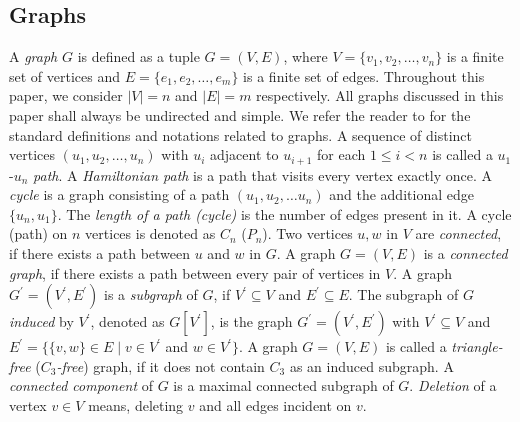 \documentclass[review, 1p]{elsarticle}
\begin{document}
\subsection{\textbf{Graphs}} \noindent A \textit{graph} $G$ is defined as a tuple $G=(V, E)$, where $V=\{v_{1},v_{2}, \ldots ,v_{n}\}$ is a finite set of vertices and $E=\{e_{1},e_{2}, \ldots ,e_{m}\}$ is a finite set of edges. Throughout this paper, we consider $\vert V \vert =n$ and $\vert E \vert =m$ respectively. All graphs discussed in this paper shall always be undirected and simple. We refer the reader to  \cite{west2001introduction} for the standard definitions and notations related to graphs. A sequence of distinct vertices $(u_{1},u_{2}, \ldots ,u_{n})$ with $u_{i}$ adjacent to $u_{i+1}$ for each $1 \leq i < n $ is called a $u_{1}$-$u_{n}$ \textit{path}. A \textit{Hamiltonian path} is a path that visits every vertex exactly once. A \textit{cycle} is a graph consisting of a path $(u_{1},u_{2}, \ldots u_{n})$ and the additional edge $\{u_{n},u_{1}\}$. The \textit{length of a path (cycle)} is the number of edges present in it. A cycle (path) on $n$ vertices is denoted as $C_{n}$ ($P_{n}$). Two vertices $u,w$ in $V$ are \textit{connected}, if there exists a path between $u$ and $w$ in $G$. A graph $G=(V,E)$ is a \textit{connected graph}, if there exists a path between every pair of vertices in $V$. A graph $G^{'}=(V^{'}, E^{'})$  is a \textit{subgraph} of $G$, if $V^{'}\subseteq V$ and $E^{'} \subseteq E$. The subgraph of $G$ \textit{induced} by $V^{'}$, denoted as $G[V^{'}]$, is the graph $G^{'}=(V^{'}, E^{'})$ with $V^{'} \subseteq V$  and  $E^{'} = \{\{v, w\} \in E \mid v \in V^{'}$  and $w \in V^{'} \}$.  A graph $G=(V,E)$ is called a \textit{triangle-free}  (\textit{$C_{3}$-free}) graph, if it does not contain $C_{3}$ as an induced subgraph. A \textit{connected component} of $G$ is a maximal connected subgraph of $G$. \textit{Deletion} of a vertex $v \in V$ means, deleting $v$ and all edges incident on $v$. 
\end{document}
